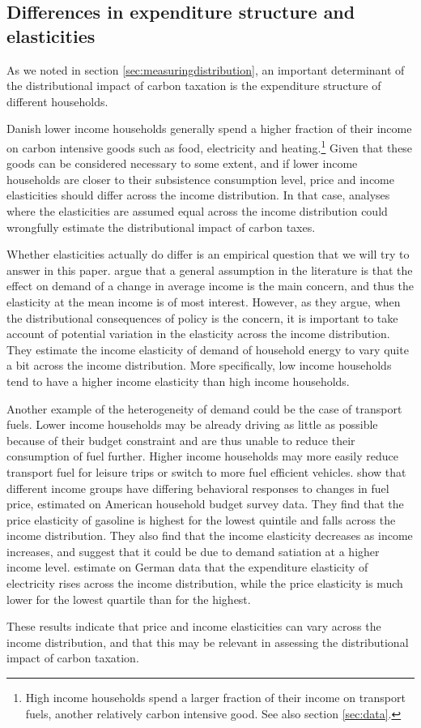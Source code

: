 \subsection{Differences in expenditure structure and elasticities}
As we noted in section \ref{sec:measuringdistribution}, an important determinant of the distributional impact of carbon taxation is the expenditure structure of different households. 

Danish lower income households generally spend a higher fraction of their income on carbon intensive goods such as food, electricity and heating.\footnote{High income households spend a larger fraction of their income on transport fuels, another relatively carbon intensive good. See also section \ref{sec:data}.} Given that these goods can be considered necessary to some extent, and if lower income households are closer to their subsistence consumption level, price and income elasticities should differ across the income distribution. In that case, analyses where the elasticities are assumed equal across the income distribution could wrongfully estimate the distributional impact of carbon taxes.

Whether elasticities actually do differ is an empirical question that we will try to answer in this paper. \cite{harold2017incomeelasticityenergy} argue that a general assumption in the literature is that the effect on demand of a change in average income is the main concern, and thus the elasticity at the mean income is of most interest. However, as they argue, when the distributional consequences of policy is the concern, it is important to take account of potential variation in the elasticity across the income distribution. They estimate the income elasticity of demand of household energy to vary quite a bit across the income distribution. More specifically, low income households tend to have a higher income elasticity than high income households.

Another example of the heterogeneity of demand could be the case of transport fuels. Lower income households may be already driving as little as possible because of their budget constraint and are thus unable to reduce their consumption of fuel further. Higher income households may more easily reduce transport fuel for leisure trips or switch to more fuel efficient vehicles. \cite{wadud2010gasoline} show that different income groups have differing behavioral responses to changes in fuel price, estimated on American household budget survey data. They find that the price elasticity of gasoline is highest for the lowest quintile and falls across the income distribution. They also find that the income elasticity decreases as income increases, and suggest that it could be due to demand satiation at a higher income level. \cite{schulte2017price} estimate on German data that the expenditure elasticity of electricity rises across the income distribution, while the price elasticity is much lower for the lowest quartile than for the highest. 

These results indicate that price and income elasticities can vary across the income distribution, and that this may be relevant in assessing the distributional impact of carbon taxation. 